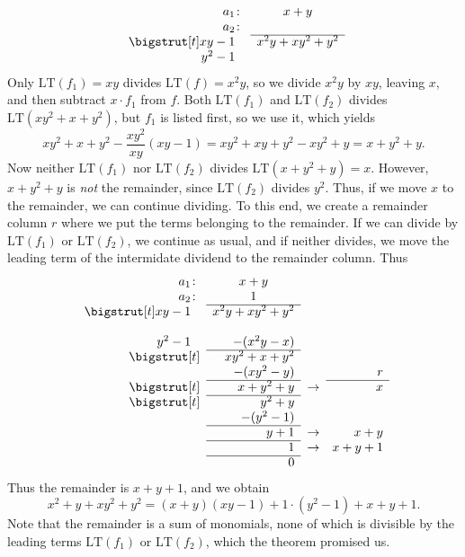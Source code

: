 \documentclass[english,bachelor]{liumaiex}
\begin{document}
\[
\begin{array}{rr}
   a_1\colon  & \CenterInCol{x+y}\\
   a_2\colon  & \\\cline{2-2}\bigstrut[t]
xy - 1\PhantC & x^ 2y+xy^2 + y^2\\
 y^2 - 1\PhantC 
\end{array}
\]
Only $\mathrm{LT}(f_1)=xy$ divides $\textrm{LT}(f)=x^2y$, so we divide $x^2y$ by $xy$, leaving $x$, and then subtract $x\cdot f_1$ from $f$. Both $\textrm{LT}(f_1)$ and $\textrm{LT}(f_2)$ divides $\textrm{LT}(xy^2 + x + y^2)$, but $f_1$ is listed first, so we use it, which yields \begin{displaymath}
xy^2+x+y^2-\frac{xy^2}{xy}(xy-1)=xy^2+xy+y^2-xy^2+y=x+y^2+y.
\end{displaymath}
Now neither $\textrm{LT}(f_1)$ nor $\textrm{LT}(f_2)$ divides $\textrm{LT}(x+y^2+y)=x$. However, $x+y^2+y$ is \emph{not} the remainder, since $\textrm{LT}(f_2)$ divides $y^2$. Thus, if we move $x$ to the remainder, we can continue dividing. To this end, we create a remainder column $r$ where we put the terms belonging to the remainder. If we can divide by $\textrm{LT}(f_1)$ or $\textrm{LT}(f_2)$, we continue as usual, and if neither divides, we move the leading term of the intermidate dividend to the remainder column. Thus
\[
\begin{array}{rrrr}
   a_1\colon  & \CenterInCol{x+y}	&			&\\
   a_2\colon  & \CenterInCol{1}		&			&\\\cline{2-2}\bigstrut[t]
xy - 1\PhantC & x^ 2y+xy^2 + y^2\\ 	& 			&\\
y^2 - 1\PhantC& -(x^ 2y - x)		&			&\\\cline{2-2}\bigstrut[t]
              & xy^2 + x + y^2 		&			&\\
              & -(xy^2 - y) 		&			& r\\\cline{2-2}\cline{4-4}\bigstrut[t]
              & x+y^2+y				&\rightarrow& x\\\cline{2-2}\bigstrut[t]
              & y^2+y				&			&\\
              & -(y^2-1)			&			&\\\cline{2-2}
              & y+1					&\rightarrow& x+y\\\cline{2-2}
              & 1					&\rightarrow& x+y+1\\\cline{2-2}
              & 0					&			&
\end{array}
\]
Thus the remainder is $x+y+1$, and we obtain
\begin{displaymath}
x^2+y+xy^2+y^2=(x+y)(xy-1)+1\cdot(y^2-1)+x+y+1.
\end{displaymath}
Note that the remainder is a sum of monomials, none of which is divisible by the leading terms $\textrm{LT}(f_1)$ or $\textrm{LT}(f_2)$, which the theorem promised us.
\end{document}
